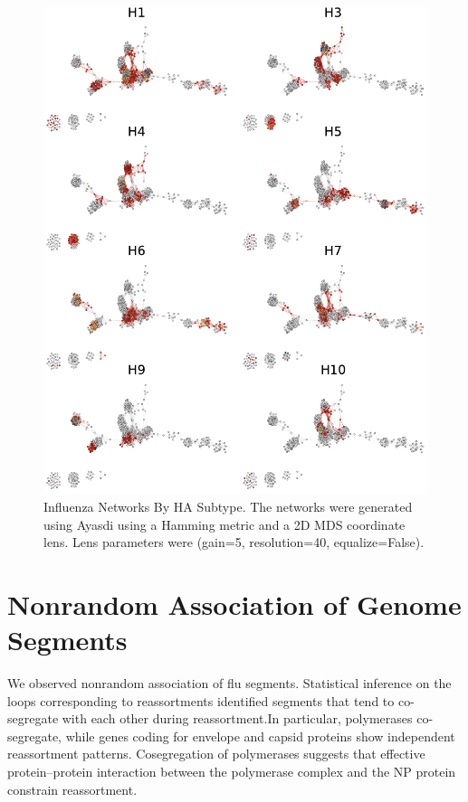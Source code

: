 
\begin{figure}
\centering
\includegraphics[width=.9\textwidth]{fig/influenza/flu_networks_by_subtype.pdf}
\caption[Influenza Networks By HA Subtype]{Influenza Networks By HA Subtype. The networks were generated using Ayasdi using a Hamming metric and a 2D MDS coordinate lens. Lens parameters were (gain=5, resolution=40, equalize=False).}
\label{fig:flu:networks_by_subtype}
\end{figure}

\section{Nonrandom Association of Genome Segments}
\label{flu:nonrandom_reassortment}

We observed nonrandom association of flu segments.
Statistical inference on the loops corresponding to reassortments identified segments that tend to co-segregate with each other during reassortment.In particular, polymerases co-segregate, while genes coding for envelope and capsid proteins show independent reassortment patterns.
Cosegregation of polymerases suggests that effective protein–protein interaction between the polymerase complex and the NP protein constrain reassortment. 

